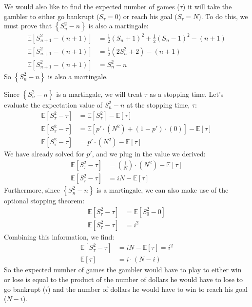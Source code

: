 We would also like to find the expected number of games ($\tau$) it will take the 
gambler to either go bankrupt ($S_\tau = 0$) or reach his goal ($S_\tau = N$).
To do this, we must prove that $\left\{S_n^2 - n\right\}$ is also a martingale:
\begin{align}
  \mathbb{E}[S_{n+1}^2 - (n+1)] &= \frac{1}{2}\left(S_n + 1\right)^2 + \frac{1}{2}\left(S_n - 1\right)^2 - (n+1) \\
  \mathbb{E}[S_{n+1}^2 - (n+1)] &= \frac{1}{2}\left(2S_n^2 + 2\right) - (n+1) \\
  \mathbb{E}[S_{n+1}^2 - (n+1)] &= S_n^2 - n 
\end{align}
So $\left\{S_n^2 - n\right\}$ is also a martingale.

Since $\left\{S_n^2 - n\right\}$ is a martingale, we will treat $\tau$ as a stopping time.
Let's evaluate the expectation value of $S_n^2 - n$ at the stopping time, $\tau$:
\begin{align}
  \mathbb{E}[S_\tau^2 - \tau] &= \mathbb{E}[S_\tau^2] - \mathbb{E}[\tau] \\
  \mathbb{E}[S_\tau^2 - \tau] &= \mathbb{E}[p'\cdot \left(N^2\right) + (1-p')\cdot\left(0\right)] - \mathbb{E}[\tau] \\ 
  \mathbb{E}[S_\tau^2 - \tau] &= p'\cdot \left(N^2\right) - \mathbb{E}[\tau]
\end{align}
We have already solved for $p'$, and we plug in the value we derived:
\begin{align}
  \mathbb{E}[S_\tau^2 - \tau] &= \left(\frac{i}{N}\right)\cdot \left(N^2\right) - \mathbb{E}[\tau] \\
  \mathbb{E}[S_\tau^2 - \tau] &= iN - \mathbb{E}[\tau]
\end{align}
Furthermore, since $\left\{S_n^2 - n\right\}$ is a martingale, we can also make use of the optional stopping theorem:
\begin{align}
  \mathbb{E}[S_\tau^2 - \tau] &= \mathbb{E}[S_0^2 - 0] \\
  \mathbb{E}[S_\tau^2 - \tau] &= i^2
\end{align}
Combining this information, we find:
\begin{align}
  \mathbb{E}[S_\tau^2 - \tau] & = iN - \mathbb{E}[\tau] = i^2 \\ 
  \mathbb{E}[\tau] &= i\cdot(N - i) 
\end{align}
So the expected number of games the gambler would have to play to either win or lose
is equal to the product of the number of dollars he would have to lose to go bankrupt ($i$)
and the number of dollars he would have to win to reach his goal ($N-i$).
